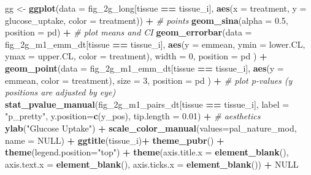 \documentclass[]{book}
\newenvironment{Shaded}{\begin{snugshade}}{\end{snugshade}}
\newcommand{\CommentTok}[1]{\textcolor[rgb]{0.56,0.35,0.01}{\textit{#1}}}
\newcommand{\DataTypeTok}[1]{\textcolor[rgb]{0.13,0.29,0.53}{#1}}
\newcommand{\DecValTok}[1]{\textcolor[rgb]{0.00,0.00,0.81}{#1}}
\newcommand{\FloatTok}[1]{\textcolor[rgb]{0.00,0.00,0.81}{#1}}
\newcommand{\KeywordTok}[1]{\textcolor[rgb]{0.13,0.29,0.53}{\textbf{#1}}}
\newcommand{\NormalTok}[1]{#1}
\newcommand{\OperatorTok}[1]{\textcolor[rgb]{0.81,0.36,0.00}{\textbf{#1}}}
\newcommand{\OtherTok}[1]{\textcolor[rgb]{0.56,0.35,0.01}{#1}}
\newcommand{\StringTok}[1]{\textcolor[rgb]{0.31,0.60,0.02}{#1}}
\begin{document}
\begin{Shaded}
\begin{Highlighting}[]
\NormalTok{  gg <-}\StringTok{ }\KeywordTok{ggplot}\NormalTok{(}\DataTypeTok{data =}\NormalTok{ fig_2g_long[tissue }\OperatorTok{==}\StringTok{ }\NormalTok{tissue_i],}
                      \KeywordTok{aes}\NormalTok{(}\DataTypeTok{x =}\NormalTok{ treatment,}
                          \DataTypeTok{y =}\NormalTok{ glucose_uptake,}
                          \DataTypeTok{color =}\NormalTok{ treatment)) }\OperatorTok{+}
\StringTok{    }
\StringTok{    }\CommentTok{# points}
\StringTok{    }\KeywordTok{geom_sina}\NormalTok{(}\DataTypeTok{alpha =} \FloatTok{0.5}\NormalTok{,}
              \DataTypeTok{position =}\NormalTok{ pd) }\OperatorTok{+}
\StringTok{    }
\StringTok{    }\CommentTok{# plot means and CI}
\StringTok{    }\KeywordTok{geom_errorbar}\NormalTok{(}\DataTypeTok{data =}\NormalTok{ fig_2g_m1_emm_dt[tissue }\OperatorTok{==}\StringTok{ }\NormalTok{tissue_i],}
                  \KeywordTok{aes}\NormalTok{(}\DataTypeTok{y =}\NormalTok{ emmean,}
                      \DataTypeTok{ymin =}\NormalTok{ lower.CL,}
                      \DataTypeTok{ymax =}\NormalTok{ upper.CL,}
                      \DataTypeTok{color =}\NormalTok{ treatment),}
                  \DataTypeTok{width =} \DecValTok{0}\NormalTok{,}
                  \DataTypeTok{position =}\NormalTok{ pd}
\NormalTok{    ) }\OperatorTok{+}
\StringTok{    }
\StringTok{    }\KeywordTok{geom_point}\NormalTok{(}\DataTypeTok{data =}\NormalTok{ fig_2g_m1_emm_dt[tissue }\OperatorTok{==}\StringTok{ }\NormalTok{tissue_i],}
               \KeywordTok{aes}\NormalTok{(}\DataTypeTok{y =}\NormalTok{ emmean,}
                   \DataTypeTok{color =}\NormalTok{ treatment),}
               \DataTypeTok{size =} \DecValTok{3}\NormalTok{,}
               \DataTypeTok{position =}\NormalTok{ pd}
\NormalTok{    ) }\OperatorTok{+}
\StringTok{    }
\StringTok{    }\CommentTok{# plot p-values (y positions are adjusted by eye)}
\StringTok{    }\KeywordTok{stat_pvalue_manual}\NormalTok{(fig_2g_m1_pairs_dt[tissue }\OperatorTok{==}\StringTok{ }\NormalTok{tissue_i],}
                       \DataTypeTok{label =} \StringTok{"p_pretty"}\NormalTok{,}
                       \DataTypeTok{y.position=}\KeywordTok{c}\NormalTok{(y_pos),}
                       \DataTypeTok{tip.length =} \FloatTok{0.01}\NormalTok{) }\OperatorTok{+}
\StringTok{    }
\StringTok{    }\CommentTok{# aesthetics}
\StringTok{    }\KeywordTok{ylab}\NormalTok{(}\StringTok{"Glucose Uptake"}\NormalTok{) }\OperatorTok{+}
\StringTok{    }\KeywordTok{scale_color_manual}\NormalTok{(}\DataTypeTok{values=}\NormalTok{pal_nature_mod,}
                       \DataTypeTok{name =} \OtherTok{NULL}\NormalTok{) }\OperatorTok{+}
\StringTok{    }\KeywordTok{ggtitle}\NormalTok{(tissue_i)}\OperatorTok{+}
\StringTok{    }
\StringTok{    }\KeywordTok{theme_pubr}\NormalTok{() }\OperatorTok{+}
\StringTok{    }\KeywordTok{theme}\NormalTok{(}\DataTypeTok{legend.position=}\StringTok{"top"}\NormalTok{) }\OperatorTok{+}
\StringTok{    }\KeywordTok{theme}\NormalTok{(}\DataTypeTok{axis.title.x =} \KeywordTok{element_blank}\NormalTok{(),}
          \DataTypeTok{axis.text.x =} \KeywordTok{element_blank}\NormalTok{(),}
          \DataTypeTok{axis.ticks.x =} \KeywordTok{element_blank}\NormalTok{()) }\OperatorTok{+}
\StringTok{    }
\StringTok{    }\OtherTok{NULL}
  

\end{Highlighting}
\end{Shaded}
\end{document}
